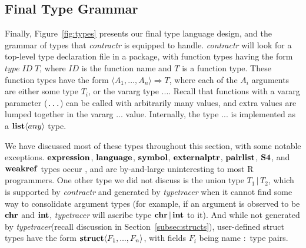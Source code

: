 \documentclass[acmsmall,review,anonymous]{acmart}\settopmatter{printfolios=true,printccs=false,printacmref=false}
\newcommand{\code}[1]{{\lstinline[style=Rin]!#1!}\xspace}
\newcommand{\contractr}{\emph{contractr}\xspace} %
\newcommand{\typetracer}{\emph{typetracer}\xspace} %
\begin{document}
\subsection{Final Type Grammar}

Finally, Figure~\ref{fig:types} presents our final type language design, and the grammar of types that \contractr is equipped to handle.
\contractr will look for a top-level type declaration file in a package, with function types having the form $type \; ID \; T$, where $ID$ is the function name and $T$ is a function type.
These function types have the form $\langle A_1 , ..., A_n\rangle \Rightarrow T$, where each of the $A_i$ arguments are either some type $T_i$, or the vararg type $...$.
Recall that functions with a vararg parameter (\code{...}) can be called with arbitrarily many values, and extra values are lumped together in the vararg $...$ value.
Internally, the type $...$ is implemented as a ${\bf list} \langle any \rangle$ type.

We have discussed most of these types throughout this section, with some notable exceptions.
${\bf expression}$, ${\bf language}$, ${\bf symbol}$, ${\bf externalptr}$, ${\bf pairlist}$, ${\bf S4}$, and ${\bf weakref}$ types occur , and are by-and-large uninteresting to most R programmers.
One other type we did not discuss is the union type $T_1 \, | \, T_2$, which is supported by \contractr and generated by \typetracer when it cannot find some way to consolidate argument types (for example, if an argument is observed to be ${\bf chr}$ and ${\bf int}$, \typetracer will ascribe type ${\bf chr} \, | \, {\bf int}$ to it).
And while not generated by \typetracer (recall discussion in Section~\ref{subsec:structs}), user-defined struct types have the form ${\bf struct}\langle F_1, ..., F_n \rangle$, with fields $F_i$ being name $:$ type pairs.

\label{subsec:typegrammar}
\end{document}
